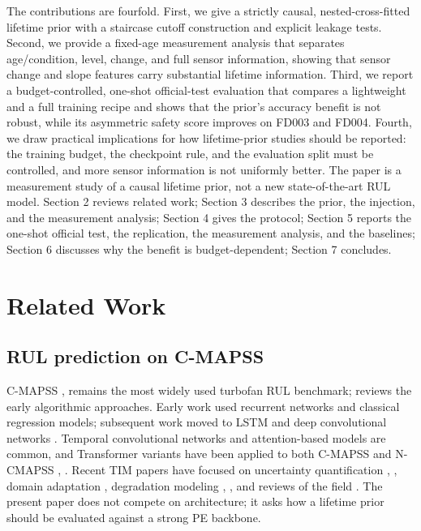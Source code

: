 \documentclass[journal]{IEEEtran}
\begin{document}
The contributions are fourfold. First, we give a strictly causal, nested-cross-fitted lifetime prior with a staircase cutoff construction and explicit leakage tests. Second, we provide a fixed-age measurement analysis that separates age/condition, level, change, and full sensor information, showing that sensor change and slope features carry substantial lifetime information. Third, we report a budget-controlled, one-shot official-test evaluation that compares a lightweight and a full training recipe and shows that the prior's accuracy benefit is not robust, while its asymmetric safety score improves on FD003 and FD004. Fourth, we draw practical implications for how lifetime-prior studies should be reported: the training budget, the checkpoint rule, and the evaluation split must be controlled, and more sensor information is not uniformly better. The paper is a measurement study of a causal lifetime prior, not a new state-of-the-art RUL model. Section 2 reviews related work; Section 3 describes the prior, the injection, and the measurement analysis; Section 4 gives the protocol; Section 5 reports the one-shot official test, the replication, the measurement analysis, and the baselines; Section 6 discusses why the benefit is budget-dependent; Section 7 concludes.

\section{Related Work}
\subsection{RUL prediction on C-MAPSS}
C-MAPSS \cite{ref1}, \cite{ref2} remains the most widely used turbofan RUL benchmark; \cite{ref18} reviews the early algorithmic approaches. Early work used recurrent networks \cite{ref19} and classical regression models; subsequent work moved to LSTM \cite{ref20} and deep convolutional networks \cite{ref21}. Temporal convolutional networks and attention-based models are common, and Transformer variants have been applied to both C-MAPSS and N-CMAPSS \cite{ref10}, \cite{ref8}. Recent TIM papers have focused on uncertainty quantification \cite{ref3}, \cite{ref4}, domain adaptation \cite{ref5}, degradation modeling \cite{ref7}, \cite{ref6}, and reviews of the field \cite{ref9}. The present paper does not compete on architecture; it asks how a lifetime prior should be evaluated against a strong PE backbone.
\end{document}

